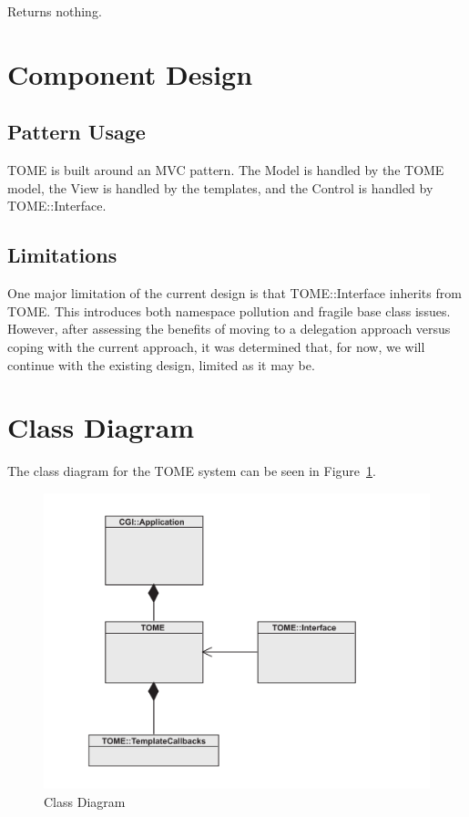 \documentclass[12pt,titlepage]{article}
\begin{document}
Returns nothing.



\section{Component Design}
\subsection{Pattern Usage}
TOME is built around an MVC pattern.  The Model is handled by the TOME model, the View is handled by the templates, and the Control is handled by TOME::Interface.
\subsection{Limitations}
One major limitation of the current design is that TOME::Interface inherits from TOME.  This introduces both namespace pollution and fragile base class issues.  However, after assessing the benefits of moving to a delegation approach versus coping with the current approach, it was determined that, for now, we will continue with the existing design, limited as it may be.


\section{Class Diagram}
The class diagram for the TOME system can be seen in Figure~\ref{ComponentDiagram}.
\begin{figure}[h]
	\includegraphics[width=\textwidth]{ComponentDiagram}
	\caption{Class Diagram}
	\label{ComponentDiagram}
\end{figure}
\end{document}
